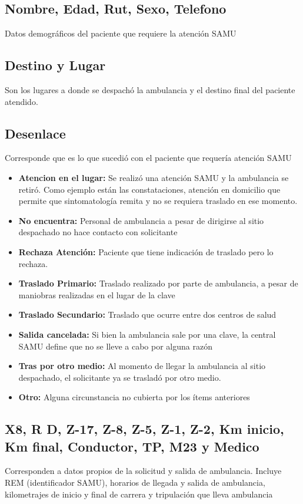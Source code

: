 \documentclass{article}
\begin{document}
\subsection{Nombre, Edad, Rut, Sexo, Telefono}
Datos demográficos del paciente que requiere la atención SAMU
\subsection{Destino y Lugar}
Son los lugares a donde se despachó la ambulancia y el destino final del paciente atendido.
\subsection{Desenlace}
Corresponde que es lo que sucedió con el paciente que requería atención SAMU
\begin{itemize}
\item \textbf{Atencion en el lugar:} Se realizó una atención SAMU y la ambulancia se retiró. Como ejemplo están las constataciones, atención en domicilio que permite que sintomatología remita y no se requiera traslado en ese momento.
\item \textbf{No encuentra:} Personal de ambulancia a pesar de dirigirse al sitio despachado no hace contacto con solicitante
\item \textbf{Rechaza Atención:} Paciente que tiene indicación de traslado pero lo rechaza.
\item \textbf{Traslado Primario:} Traslado realizado por parte de ambulancia, a pesar de maniobras realizadas en el lugar de la clave
\item \textbf{Traslado Secundario:} Traslado que ocurre entre dos centros de salud
\item \textbf{Salida cancelada:} Si bien la ambulancia sale por una clave, la central SAMU define que no se lleve a cabo por alguna razón
\item \textbf{Tras por otro medio:} Al momento de llegar la ambulancia al sitio despachado, el solicitante ya se trasladó por otro medio.
\item \textbf{Otro:} Alguna circunstancia no cubierta por los ítems anteriores
\end{itemize}

\subsection{X8, R	D, Z-17, Z-8, Z-5, Z-1, Z-2, Km inicio, Km final, Conductor, TP, M23 y Medico}
Corresponden a datos propios de la solicitud y salida de ambulancia. Incluye REM (identificador SAMU), horarios de llegada y salida de ambulancia, kilometrajes de inicio y final de carrera y tripulación que lleva ambulancia
\end{document}
